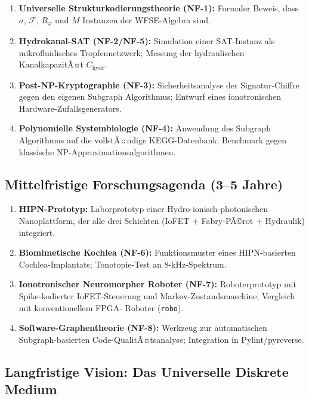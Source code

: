 ﻿\documentclass[a4paper,12pt]{scrreprt}
\theoremstyle{definition}
\begin{document}
\begin{enumerate}
  \item \textbf{Universelle Strukturkodierungstheorie (NF-1):}
    Formaler Beweis, dass $\sigma$, $\mathcal{F}$, $R_\varphi$ und $M$
    Instanzen der WFSE-Algebra sind.

  \item \textbf{Hydrokanal-SAT (NF-2/NF-5):}
    Simulation einer SAT-Instanz als mikrofluidisches Tropfennetzwerk;
    Messung der hydraulischen KanalkapazitÃ¤t $C_{\mathrm{hydr}}$.

  \item \textbf{Post-NP-Kryptographie (NF-3):}
    Sicherheitsanalyse der Signatur-Chiffre gegen den eigenen
    Subgraph Algorithmus; Entwurf eines ionotronischen
    Hardware-Zufallsgenerators.

  \item \textbf{Polynomielle Systembiologie (NF-4):}
    Anwendung des Subgraph Algorithmus auf die vollstÃ¤ndige
    KEGG-Datenbank; Benchmark gegen klassische NP-Approxi\-mationsalgorithmen.
\end{enumerate}

\subsection{Mittelfristige Forschungsagenda (3--5 Jahre)}

\begin{enumerate}
  \item \textbf{HIPN-Prototyp:} Laborprototyp einer
    Hydro-ionisch-photonischen Nanoplattform, der alle drei
    Schichten (IoFET + Fabry-PÃ©rot + Hydraulik) integriert.

  \item \textbf{Biomimetische Kochlea (NF-6):}
    Funktionsmuster eines HIPN-basierten Cochlea-Implantats;
    Tonotopie-Test an 8-kHz-Spektrum.

  \item \textbf{Ionotronischer Neuromorpher Roboter (NF-7):}
    Roboterprototyp mit Spike-kodierter IoFET-Steuerung und
    Markov-Zustandsmaschine; Vergleich mit konventionellem FPGA-
    Roboter (\texttt{robo}).

  \item \textbf{Software-Graphentheorie (NF-8):}
    Werkzeug zur automatischen Subgraph-basierten Code-QualitÃ¤tsanalyse;
    Integration in Pylint/pyreverse.
\end{enumerate}

\subsection{Langfristige Vision: Das Universelle Diskrete Medium}
\end{document}

